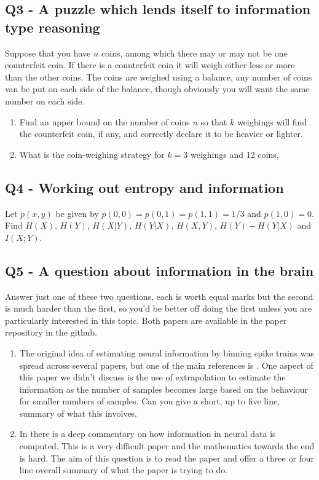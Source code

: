 \documentclass[12pt]{article}
\begin{document}
\subsection*{Q3 - A puzzle which lends itself to information type reasoning}

Suppose that you have $n$ coins, among which there may or may not be
one counterfeit coin. If there is a counterfeit coin it will weigh
either less or more than the other coins. The coins are weighed using
a balance, any number of coins van be put on each side of the balance,
though obviously you will want the same number on each side.
\begin{enumerate}
\item Find an upper bound on the number of coins $n$ so that $k$
  weighings will find the counterfeit coin, if any, and correctly
  declare it to be heavier or lighter.
\item What is the coin-weighing strategy for $k=3$ weighings and 12
  coins,
\end{enumerate}

\subsection*{Q4 - Working out entropy and information}

Let $p(x,y)$ be given by $p(0,0)=p(0,1)=p(1,1)=1/3$ and
$p(1,0)=0$. Find $H(X)$, $H(Y)$, $H(X|Y)$, $H(Y|X)$, $H(X,Y)$,
$H(Y)-H(Y|X)$ and $I(X;Y)$.

\subsection*{Q5 - A question about information in the brain}

Answer just one of these two questions, each is worth equal marks but the
second is much harder than the first, so you'd be better off doing the
first unless you are particularly interested in this topic. Both papers are available in the paper repository in the github.

\begin{enumerate}
\item The original idea of estimating neural information by binning
  spike trains was spread across several papers, but one of the main
  references is \cite{StrongEtAl1998}. One aspect of this paper we
  didn't discuss is the use of extrapolation to estimate the
  information as the number of samples becomes large based on the
  behaviour for smaller numbers of samples. Can you give a short, up
  to five line, summary of what this involves.

\item In \cite{NemenmanEtAl2004} there is a deep commentary on how
  information in neural data is computed. This is a very difficult
  paper and the mathematics towards the end is hard. The aim of this
  question is to read the paper and offer a three or four line overall
  summary of what the paper is trying to do.
\end{enumerate}


{}
\end{document}
